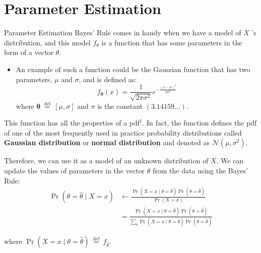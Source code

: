 \documentclass[9pt,dvipsnames]{beamer}
\begin{document}
\section{Parameter Estimation}
\begin{frame}{Parameter Estimation}
	Bayes' Rule comes in handy when we have a model of $X$ 's distribution, and this model $f_{\theta}$ is a function that has some parameters in the form of a vector $\theta$.
	\begin{itemize}
		\item An example of such a function could be the Gaussian function that has two parameters, $\mu$ and $\sigma$, and is defined as:
		      $$
			      f_{\boldsymbol{\theta}}(x)=\frac{1}{\sqrt{2 \pi \sigma^{2}}} e^{-\frac{(x-\mu)^{2}}{2 \sigma^{2}}}
		      $$
		      where $\boldsymbol{\theta} \stackrel{\text { def }}{=}[\mu, \sigma]$ and $\pi$ is the constant $(3.14159 \ldots)$.
	\end{itemize}

	This function has all the properties of a $\mathrm{pdf}^{1}$. In fact, the function defines the pdf of one of the most frequently used in practice probability distributions called \textbf{Gaussian distribution} or \textbf{normal distribution} and denoted as $\mathcal{N}\left(\mu, \sigma^{2}\right)$.
\end{frame}

\begin{frame}
	Therefore, we can use it as a model of an unknown distribution of $X$. We can update the values of parameters in the vector $\theta$ from the data using the Bayes' Rule:
	\begin{equation*}
		\begin{aligned}
			\operatorname{Pr}(\theta=\hat{\theta} \mid X=x) & \leftarrow \frac{\operatorname{Pr}(X=x \mid \theta=\hat{\theta}) \operatorname{Pr}(\theta=\hat{\theta})}{\operatorname{Pr}(X=x)}                                                                                  \\
			                                                & = \frac{\operatorname{Pr}(X=x \mid \theta=\hat{\theta}) \operatorname{Pr}(\theta=\hat{\theta})}{\sum_{\tilde{\theta}} \operatorname{Pr}(X=x \mid \theta=\tilde{\theta}) \operatorname{Pr}(\theta=\tilde{\theta})}
		\end{aligned}
	\end{equation*}

	where $\operatorname{Pr}(X=x \mid \theta=\hat{\theta}) \stackrel{\text { def }}{=} f_{\hat{\theta}}$.
\end{frame}
\end{document}
